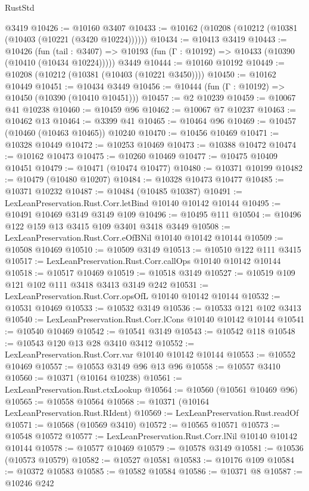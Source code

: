 \begin{lexlean}{RustStd}
\begin{coremodule}
    @3419
@10426 := @10160 @3407
@10433 := @10162 (@10208 (@10212 (@10381 (@10403 (@10221 (@3420 @10224))))))
@10434 := @10413 @3419
@10443 := @10426
    (fun (tail : @3407) => @10193 (fun (Γ : @10192) => @10433 (@10390 (@10410 (@10434 @10224)))))
    @3449
@10444 := @10160 @10192
@10449 := @10208 (@10212 (@10381 (@10403 (@10221 @3450))))
@10450 := @10162 @10449
@10451 := @10434 @3449
@10456 := @10444 (fun (Γ : @10192) => @10450 (@10390 (@10410 @10451)))
@10457 := @2 @10239
@10459 := @10067 @41 @10238
@10460 := @10459 @96
@10462 := @10067 @7 @10237
@10463 := @10462 @13
@10464 := @3399 @41
@10465 := @10464 @96
@10469 := @10457 (@10460 (@10463 @10465)) @10240
@10470 := @10456 @10469
@10471 := @10328 @10449
@10472 := @10253 @10469
@10473 := @10388 @10472
@10474 := @10162 @10473
@10475 := @10260 @10469
@10477 := @10475 @10409 @10451
@10479 := @10471 (@10474 @10477)
@10480 := @10371 @10199
@10482 := @10479 (@10480 @10207)
@10484 := @10328 @10473 @10477
@10485 := @10371 @10232
@10487 := @10484 (@10485 @10387)
@10491 := LexLeanPreservation.Rust.Corr.letBind @10140 @10142 @10144
@10495 := @10491 @10469 @3149 @3149 @109
@10496 := @10495 @111
@10504 := @10496 @122 @159 @13 @3415 @109 @3401 @3418 @3449
@10508 := LexLeanPreservation.Rust.Corr.eOfBNil @10140 @10142 @10144
@10509 := @10508 @10469
@10510 := @10509 @3149
@10513 := @10510 @122 @111 @3415
@10517 := LexLeanPreservation.Rust.Corr.callOps @10140 @10142 @10144
@10518 := @10517 @10469
@10519 := @10518 @3149
@10527 := @10519 @109 @121 @102 @111 @3418 @3413 @3149 @242
@10531 := LexLeanPreservation.Rust.Corr.opsOfL @10140 @10142 @10144
@10532 := @10531 @10469
@10533 := @10532 @3149
@10536 := @10533 @121 @102 @3413
@10540 := LexLeanPreservation.Rust.Corr.lCons @10140 @10142 @10144
@10541 := @10540 @10469
@10542 := @10541 @3149
@10543 := @10542 @118
@10548 := @10543 @120 @13 @28 @3410 @3412
@10552 := LexLeanPreservation.Rust.Corr.var @10140 @10142 @10144
@10553 := @10552 @10469
@10557 := @10553 @3149 @96 @13 @96
@10558 := @10557 @3410
@10560 := @10371 (@10164 @10238)
@10561 := LexLeanPreservation.Rust.ctxLookup
@10564 := @10560 (@10561 @10469 @96)
@10565 := @10558 @10564
@10568 := @10371 (@10164 LexLeanPreservation.Rust.RIdent)
@10569 := LexLeanPreservation.Rust.readOf
@10571 := @10568 (@10569 @3410)
@10572 := @10565 @10571
@10573 := @10548 @10572
@10577 := LexLeanPreservation.Rust.Corr.lNil @10140 @10142 @10144
@10578 := @10577 @10469
@10579 := @10578 @3149
@10581 := @10536 (@10573 @10579)
@10582 := @10527 @10581
@10583 := @10176 @109
@10584 := @10372 @10583
@10585 := @10582 @10584
@10586 := @10371 @8
@10587 := @10246 @242

\end{coremodule}
\end{lexlean}
